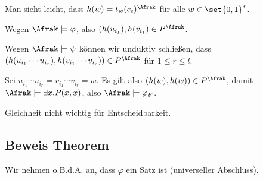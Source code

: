 \begin{description}
  Man sieht leicht, dass $h(w)=t_w(c_\epsilon)^\Afrak$ für alle $w\in\set{0,1}^*$.
  
  Wegen $\Afrak \models \varphi$, also $(h(u_{i_1}), h(v_{i_1}) \in P^{\Afrak}$.
  
  Wegen $\Afrak \models \psi$ können wir unduktiv schließen, dass
  $(h(u_{i_1}\cdots u_{i_r}), h(v_{i_1}\cdots v_{i_r}))\in P^{\Afrak}$
  für $1\leq r\leq l$.
  
  Sei $u_{i_1}\cdots u_{i_r} = v_{i_1}\cdots v_{i_r} = w$. Es gilt also
  $(h(w),h(w)) \in P^{\Afrak}$, damit $\Afrak \models \exists x.P(x,x)$,
  also $\Afrak\models\varphi_F$.
\end{description}

Gleichheit nicht wichtig für Entscheidbarkeit.\\

\subsection{Beweis Theorem}

Wir nehmen o.B.d.A. an, dass $\varphi$ ein Satz ist (universeller Abschluss).

